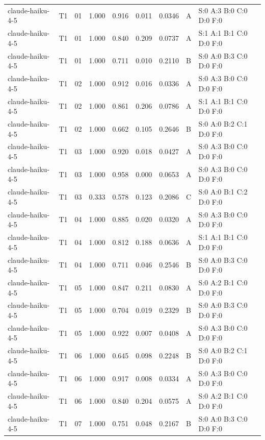 \begin{longtable}{llrrrrrll}
claude-haiku-4-5 & T1 & 01 & 1.000 & 0.916 & 0.011 & 0.0346 & A & \tiny S:0 A:3 B:0 C:0 D:0 F:0 \\
claude-haiku-4-5 & T1 & 01 & 1.000 & 0.840 & 0.209 & 0.0737 & A & \tiny S:1 A:1 B:1 C:0 D:0 F:0 \\
claude-haiku-4-5 & T1 & 01 & 1.000 & 0.711 & 0.010 & 0.2110 & B & \tiny S:0 A:0 B:3 C:0 D:0 F:0 \\
claude-haiku-4-5 & T1 & 02 & 1.000 & 0.912 & 0.016 & 0.0336 & A & \tiny S:0 A:3 B:0 C:0 D:0 F:0 \\
claude-haiku-4-5 & T1 & 02 & 1.000 & 0.861 & 0.206 & 0.0786 & A & \tiny S:1 A:1 B:1 C:0 D:0 F:0 \\
claude-haiku-4-5 & T1 & 02 & 1.000 & 0.662 & 0.105 & 0.2646 & B & \tiny S:0 A:0 B:2 C:1 D:0 F:0 \\
claude-haiku-4-5 & T1 & 03 & 1.000 & 0.920 & 0.018 & 0.0427 & A & \tiny S:0 A:3 B:0 C:0 D:0 F:0 \\
claude-haiku-4-5 & T1 & 03 & 1.000 & 0.958 & 0.000 & 0.0653 & A & \tiny S:0 A:3 B:0 C:0 D:0 F:0 \\
claude-haiku-4-5 & T1 & 03 & 0.333 & 0.578 & 0.123 & 0.2086 & C & \tiny S:0 A:0 B:1 C:2 D:0 F:0 \\
claude-haiku-4-5 & T1 & 04 & 1.000 & 0.885 & 0.020 & 0.0320 & A & \tiny S:0 A:3 B:0 C:0 D:0 F:0 \\
claude-haiku-4-5 & T1 & 04 & 1.000 & 0.812 & 0.188 & 0.0636 & A & \tiny S:1 A:1 B:1 C:0 D:0 F:0 \\
claude-haiku-4-5 & T1 & 04 & 1.000 & 0.711 & 0.046 & 0.2546 & B & \tiny S:0 A:0 B:3 C:0 D:0 F:0 \\
claude-haiku-4-5 & T1 & 05 & 1.000 & 0.847 & 0.211 & 0.0830 & A & \tiny S:0 A:2 B:1 C:0 D:0 F:0 \\
claude-haiku-4-5 & T1 & 05 & 1.000 & 0.704 & 0.019 & 0.2329 & B & \tiny S:0 A:0 B:3 C:0 D:0 F:0 \\
claude-haiku-4-5 & T1 & 05 & 1.000 & 0.922 & 0.007 & 0.0408 & A & \tiny S:0 A:3 B:0 C:0 D:0 F:0 \\
claude-haiku-4-5 & T1 & 06 & 1.000 & 0.645 & 0.098 & 0.2248 & B & \tiny S:0 A:0 B:2 C:1 D:0 F:0 \\
claude-haiku-4-5 & T1 & 06 & 1.000 & 0.917 & 0.008 & 0.0334 & A & \tiny S:0 A:3 B:0 C:0 D:0 F:0 \\
claude-haiku-4-5 & T1 & 06 & 1.000 & 0.840 & 0.204 & 0.0575 & A & \tiny S:0 A:2 B:1 C:0 D:0 F:0 \\
claude-haiku-4-5 & T1 & 07 & 1.000 & 0.751 & 0.048 & 0.2167 & B & \tiny S:0 A:0 B:3 C:0 D:0 F:0 \\

\end{longtable}
